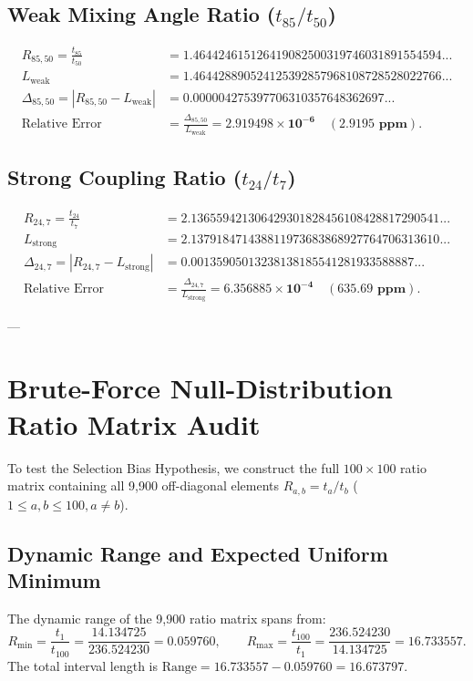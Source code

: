 \documentclass[11pt,a4paper]{article}
\begin{document}
\subsection{Weak Mixing Angle Ratio (\texorpdfstring{$t_{85} / t_{50}$}{t85 / t50})}
\begin{align}
R_{85, 50} = \frac{t_{85}}{t_{50}} &= \mathbf{1.464424615126419082500319746031891554594...} \\
L_{\text{weak}} &= \mathbf{1.464428890524125392857968108728528022766...} \\
\Delta_{85, 50} = |R_{85, 50} - L_{\text{weak}}| &= \mathbf{0.000004275397706310357648362697...} \\
\text{Relative Error} &= \frac{\Delta_{85, 50}}{L_{\text{weak}}} = \mathbf{2.919498 \times 10^{-6} \quad (2.9195 \text{ ppm})}.
\end{align}

\subsection{Strong Coupling Ratio (\texorpdfstring{$t_{24} / t_7$}{t24 / t7})}
\begin{align}
R_{24, 7} = \frac{t_{24}}{t_7} &= \mathbf{2.136559421306429301828456108428817290541...} \\
L_{\text{strong}} &= \mathbf{2.137918471438811973683868927764706313610...} \\
\Delta_{24, 7} = |R_{24, 7} - L_{\text{strong}}| &= \mathbf{0.00135905013238138185541281933588887...} \\
\text{Relative Error} &= \frac{\Delta_{24, 7}}{L_{\text{strong}}} = \mathbf{6.356885 \times 10^{-4} \quad (635.69 \text{ ppm})}.
\end{align}

---

\section{Brute-Force Null-Distribution Ratio Matrix Audit}

To test the Selection Bias Hypothesis, we construct the full $100 \times 100$ ratio matrix containing all 9,900 off-diagonal elements $R_{a, b} = t_a / t_b$ ($1 \le a, b \le 100, a \neq b$).

\subsection{Dynamic Range and Expected Uniform Minimum}
The dynamic range of the 9,900 ratio matrix spans from:
\begin{equation}
R_{\text{min}} = \frac{t_1}{t_{100}} = \frac{14.134725}{236.524230} = \mathbf{0.059760}, \qquad R_{\text{max}} = \frac{t_{100}}{t_1} = \frac{236.524230}{14.134725} = \mathbf{16.733557}.
\end{equation}
The total interval length is $\text{Range} = 16.733557 - 0.059760 = 16.673797$.
\end{document}
